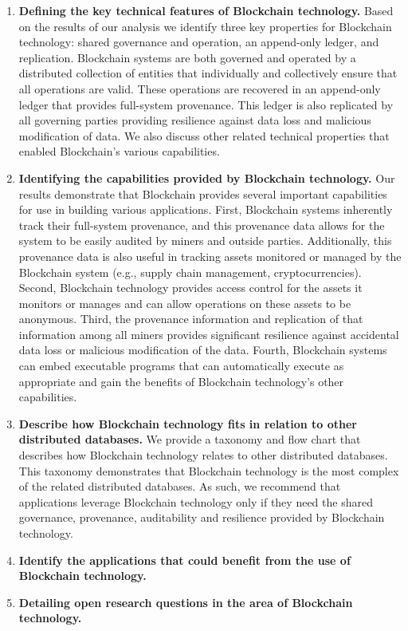 \begin{enumerate}
	\item \textbf{Defining the key technical features of Blockchain technology.}
	Based on the results of our analysis we identify three key properties for Blockchain technology: shared governance and operation, an append-only ledger, and replication.
	Blockchain systems are both governed and operated by a distributed collection of entities that individually and collectively ensure that all operations are valid.
	These operations are recovered in an append-only ledger that provides full-system provenance.
	This ledger is also replicated by all governing parties providing resilience against data loss and malicious modification of data.
	We also discuss other related technical properties that enabled Blockchain's various capabilities.
	
	\item \textbf{Identifying the capabilities provided by Blockchain technology.}
	Our results demonstrate that Blockchain provides several important capabilities for use in building various applications.
	First, Blockchain systems inherently track their full-system provenance, and this provenance data allows for the system to be easily audited by miners and outside parties.
	Additionally, this provenance data is also useful in tracking assets monitored or managed by the Blockchain system (e.g., supply chain management, cryptocurrencies).
	Second, Blockchain technology provides access control for the assets it monitors or manages and can allow operations on these assets to be anonymous.
	Third, the provenance information and replication of that information among all miners provides significant resilience against accidental data loss or malicious modification of the data.
	Fourth, Blockchain systems can embed executable programs that can automatically execute as appropriate and gain the benefits of Blockchain technology's other capabilities.
		
	\item \textbf{Describe how Blockchain technology fits in relation to other distributed databases.}
	We provide a taxonomy and flow chart that describes how Blockchain technology relates to other distributed databases.
	This taxonomy demonstrates that Blockchain technology is the most complex of the related distributed databases.
	As such, we recommend that applications leverage Blockchain technology only if they need the shared governance, provenance, auditability and resilience provided by Blockchain technology.
	
	\item \textbf{Identify the applications that could benefit from the use of Blockchain technology.}
	
	\item \textbf{Detailing open research questions in the area of Blockchain technology.}
	
\end{enumerate}
